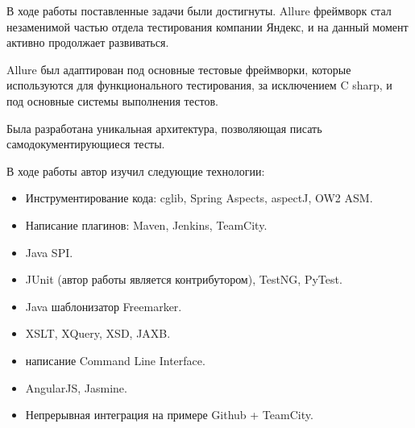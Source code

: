\startconclusionpage

В ходе работы поставленные задачи были достигнуты. Allure фреймворк стал незаменимой частью отдела тестирования компании Яндекс, и на данный момент активно продолжает развиваться.

Allure был адаптирован под основные тестовые фреймворки, которые используются для функционального тестирования, за исключением C sharp, и под основные системы выполнения тестов.

Была разработана уникальная архитектура, позволяющая писать самодокументирующиеся тесты.

В ходе работы автор изучил следующие технологии:

\begin{itemize}
\item Инструментирование кода: cglib, Spring Aspects, aspectJ, OW2 ASM.
\item Написание плагинов: Maven, Jenkins, TeamCity.
\item Java SPI.
\item JUnit (автор работы является контрибутором), TestNG, PyTest.
\item Java шаблонизатор Freemarker.
\item XSLT, XQuery, XSD, JAXB.
\item написание Command Line Interface.
\item AngularJS, Jasmine.
\item Непрерывная интеграция на примере Github + TeamCity.
\end{itemize}

 
